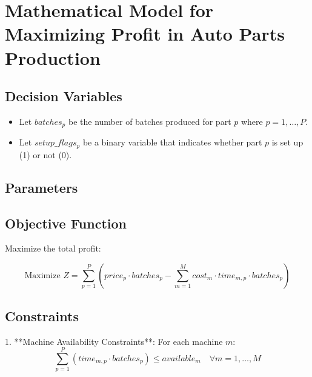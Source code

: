 \documentclass{article}
\begin{document}
\section*{Mathematical Model for Maximizing Profit in Auto Parts Production}

\subsection*{Decision Variables}
\begin{itemize}
    \item Let \( batches_{p} \) be the number of batches produced for part \( p \) where \( p = 1, \ldots, P \).
    \item Let \( setup\_flags_{p} \) be a binary variable that indicates whether part \( p \) is set up (1) or not (0).
\end{itemize}

\subsection*{Parameters}

\subsection*{Objective Function}
Maximize the total profit:

\[
\text{Maximize } Z = \sum_{p=1}^{P} \left( price_{p} \cdot batches_{p} - \sum_{m=1}^{M} cost_{m} \cdot time_{m,p} \cdot batches_{p} \right)
\]

\subsection*{Constraints}

1. **Machine Availability Constraints**:
   For each machine \( m \):
   \[
   \sum_{p=1}^{P} (time_{m,p} \cdot batches_{p}) \leq available_{m} \quad \forall m = 1, \ldots, M
   \]
\end{document}
